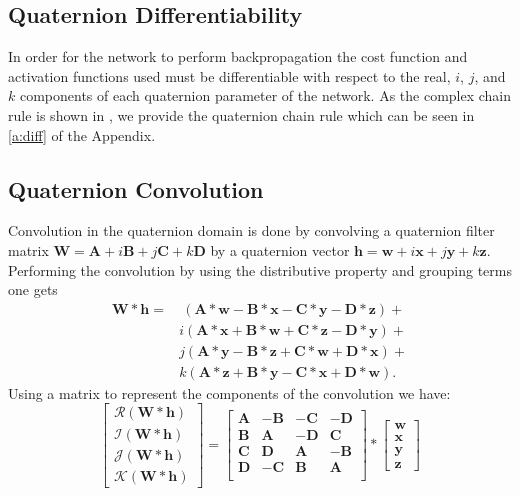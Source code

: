 \documentclass[14pt,a4paper]{article}
\begin{document}
\subsection{Quaternion Differentiability}
In order for the network to perform backpropagation the cost function and activation functions used must be differentiable with respect to the real, $i$, $j$, and $k$ components of each quaternion parameter of the network.
As the complex chain rule is shown in \cite{trabelsi2017deep}, we provide the quaternion chain rule which can be seen in \ref{a:diff} of the Appendix.


\subsection{Quaternion Convolution}\label{s:qc}
Convolution in the quaternion domain is done by convolving a quaternion filter matrix $\textbf{W}=\textbf{A}+\textit{i}\textbf{B}+\textit{j}\textbf{C}+\textit{k}\textbf{D}$ by a quaternion vector $\textbf{h}=\textbf{w}+\textit{i}\textbf{x}+\textit{j}\textbf{y}+\textit{k}\textbf{z}$. 
Performing the convolution by using the distributive property and grouping terms one gets
\begin{align}
\textbf{W}\ast \textbf{h} = &~(\textbf{A}\ast\textbf{w}-\textbf{B}\ast\textbf{x}-\textbf{C}\ast\textbf{y}-\textbf{D}\ast\textbf{z}) + \nonumber \\ 
&\textit{i}(\textbf{A}\ast\textbf{x}+\textbf{B}\ast\textbf{w}+\textbf{C}\ast\textbf{z}-\textbf{D}\ast\textbf{y}) + \nonumber \\
&\textit{j}(\textbf{A}\ast\textbf{y}-\textbf{B}\ast\textbf{z}+\textbf{C}\ast\textbf{w}+\textbf{D}\ast\textbf{x}) + \nonumber \\
&\textit{k}(\textbf{A}\ast\textbf{z}+\textbf{B}\ast\textbf{y}-\textbf{C}\ast\textbf{x}+\textbf{D}\ast\textbf{w}).
\label{eq:convolve1}
\end{align}
Using a matrix to represent the components of the convolution we have:
\begin{equation}
\begin{bmatrix}
 \mathscr{R}(\textbf{W}\ast \textbf{h}) \\ 
 \mathscr{I}(\textbf{W}\ast \textbf{h}) \\
 \mathscr{J}(\textbf{W}\ast \textbf{h}) \\
 \mathscr{K}(\textbf{W}\ast \textbf{h}) 
\end{bmatrix}
=
\begin{bmatrix}
 \textbf{A} & -\textbf{B} & -\textbf{C} & -\textbf{D}\\
 \textbf{B} & \textbf{A} & -\textbf{D} & \textbf{C} \\
 \textbf{C} & \textbf{D} & \textbf{A} & -\textbf{B} \\
 \textbf{D} & -\textbf{C} & \textbf{B} & \textbf{A} \\
\end{bmatrix}
\ast
\begin{bmatrix}
 \textbf{w} \\ 
 \textbf{x} \\
 \textbf{y} \\
 \textbf{z}
\end{bmatrix}
\label{eq:}
\end{equation}
\end{document}
